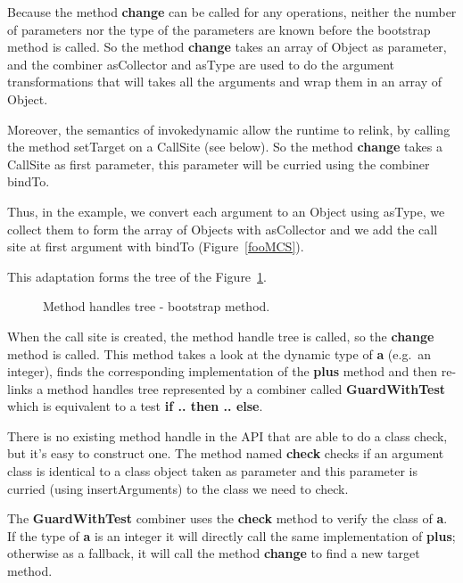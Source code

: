 \documentclass{sig-alternate}
\begin{document}
      Because the method {\bf change} can be called for any operations, neither the number of parameters nor the type
      of the parameters are known before the bootstrap method is called. So the method {\bf change} takes an array of
      Object as parameter, and the combiner asCollector and asType are used to do the argument transformations
      that will takes all the arguments and wrap them in an array of Object.

      Moreover, the semantics of invokedynamic allow the runtime to relink, by calling the method setTarget
      on a CallSite (see below). So the method {\bf change} takes a CallSite as first parameter, this parameter
      will be curried using the combiner bindTo.
       
      Thus, in the example, we convert each argument to an Object using asType,
      we collect them to form the array of Objects with asCollector and
      we add the call site at first argument with bindTo (Figure~\ref{fooMCS}).

      \noindent This adaptation forms the tree of the Figure~\ref{ast1}.

      \begin{figure}[!ht]
        \centering \resizebox{.7\linewidth}{!}{}
        \caption{Method handles tree - bootstrap method.}\vspace{-1em}
        \label{ast1}
      \end{figure}

      When the call site is created, the method handle tree is called, so the {\bf change} method is called.
      This method takes a look at the dynamic type of {\bf a} (e.g.~an integer),
      finds the corresponding implementation of the {\bf plus} method
      and then re-links a method handles tree represented by a combiner called {\bf GuardWithTest}
      which is equivalent to a test {\bf if .. then .. else}.

      There is no existing method handle in the API that are able to do a class check,
      but it's easy to construct one. The method named {\bf check} checks if an argument class
      is identical to a class object taken as parameter and this parameter is curried
      (using insertArguments) to the class we need to check.

      The {\bf GuardWithTest} combiner uses the {\bf check} method to verify the class of {\bf a}.
      If the type of {\bf a} is an integer it will directly call the same implementation of {\bf plus};
      otherwise as a fallback, it will call the method {\bf change} to find a new target method.
\end{document}
